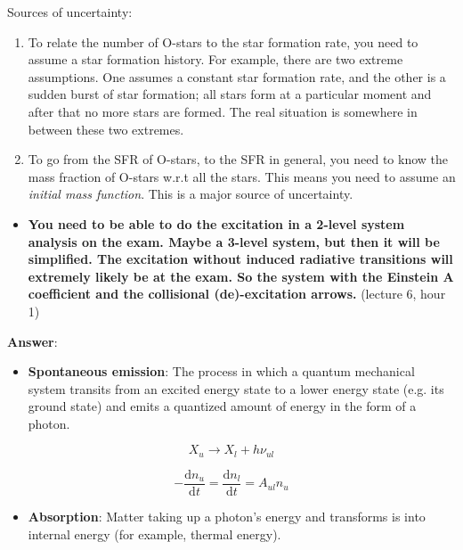 \documentclass[11pt]{article}
\providecommand{\tightlist}{%
      \setlength{\itemsep}{0pt}\setlength{\parskip}{0pt}}
\begin{document}
Sources of uncertainty:

\begin{enumerate}
\def\labelenumi{\arabic{enumi}.}
\tightlist
\item
  To relate the number of O-stars to the star formation rate, you need
  to assume a star formation history. For example, there are two extreme
  assumptions. One assumes a constant star formation rate, and the other
  is a sudden burst of star formation; all stars form at a particular
  moment and after that no more stars are formed. The real situation is
  somewhere in between these two extremes.
\item
  To go from the SFR of O-stars, to the SFR in general, you need to know
  the mass fraction of O-stars w.r.t all the stars. This means you need
  to assume an \emph{initial mass function}. This is a major source of
  uncertainty.
\end{enumerate}

    \begin{itemize}
\tightlist
\item
  \textbf{You need to be able to do the excitation in a 2-level system
  analysis on the exam. Maybe a 3-level system, but then it will be
  simplified. The excitation without induced radiative transitions will
  extremely likely be at the exam. So the system with the Einstein A
  coefficient and the collisional (de)-excitation arrows.} (lecture 6,
  hour 1)
\end{itemize}

\textbf{Answer}:

\begin{itemize}
\tightlist
\item
  \textbf{Spontaneous emission}: The process in which a quantum
  mechanical system transits from an excited energy state to a lower
  energy state (e.g. its ground state) and emits a quantized amount of
  energy in the form of a photon.
\end{itemize}

\[ X_u \rightarrow X_l + h\nu_{ul} \]

\[ - \frac{\text{d}n_u}{\text{d}t} = \frac{\text{d}n_l}{\text{d}t}= A_{ul}n_u \]

\begin{itemize}
\tightlist
\item
  \textbf{Absorption}: Matter taking up a photon's energy and transforms
  is into internal energy (for example, thermal energy).
\end{itemize}
\end{document}
